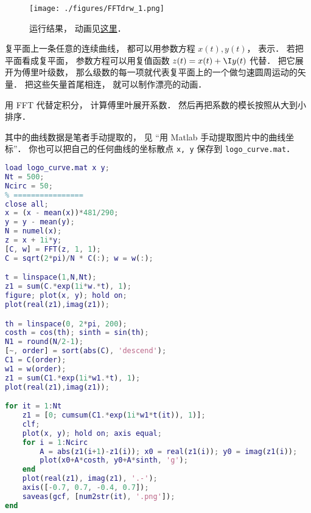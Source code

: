 
\begin{issues}
\issueDraft
\end{issues}


\begin{figure}[ht]
\centering
\texttt{[image: ./figures/FFTdrw\_1.png]}
\caption{运行结果， 动画见\href{https://wuli.wiki/apps/FFTplt.html}{这里}．} \label{FFTdrw_fig1}
\end{figure}


复平面上一条任意的连续曲线， 都可以用参数方程 $x(t), y(t)$， 表示． 若把平面看成复平面， 参数方程可以用复值函数 $z(t) = x(t) + \I y(t)$ 代替． 把它展开为傅里叶级数， 那么级数的每一项就代表复平面上的一个做匀速圆周运动的矢量． 把这些矢量首尾相连， 就可以制作漂亮的动画．

用 FFT 代替定积分， 计算傅里叶展开系数． 然后再把系数的模长按照从大到小排序．

其中的曲线数据是笔者手动提取的， 见 “用 Matlab 手动提取图片中的曲线坐标”． 你也可以把自己的任何曲线的坐标散点 \verb|x, y| 保存到 \verb|logo_curve.mat|．

\begin{lstlisting}[language=matlab, caption=FFTplt]
% ==== 参数设置 ====
load logo_curve.mat x y;
Nt = 500;
Ncirc = 50;
% ================
close all;
x = (x - mean(x))*481/290;
y = y - mean(y);
N = numel(x);
z = x + 1i*y;
[C, w] = FFT(z, 1, 1);
C = sqrt(2*pi)/N * C(:); w = w(:);

t = linspace(1,N,Nt);
z1 = sum(C.*exp(1i*w.*t), 1);
figure; plot(x, y); hold on;
plot(real(z1),imag(z1));

th = linspace(0, 2*pi, 200);
costh = cos(th); sinth = sin(th);
N1 = round(N/2-1);
[~, order] = sort(abs(C), 'descend');
C1 = C(order);
w1 = w(order);
z1 = sum(C1.*exp(1i*w1.*t), 1);
plot(real(z1),imag(z1));

for it = 1:Nt
    z1 = [0; cumsum(C1.*exp(1i*w1*t(it)), 1)];
    clf;
    plot(x, y); hold on; axis equal;
    for i = 1:Ncirc
        A = abs(z1(i+1)-z1(i)); x0 = real(z1(i)); y0 = imag(z1(i));
        plot(x0+A*costh, y0+A*sinth, 'g');
    end
    plot(real(z1), imag(z1), '.-');
    axis([-0.7, 0.7, -0.4, 0.7]);
    saveas(gcf, [num2str(it), '.png']);
end
\end{lstlisting}
